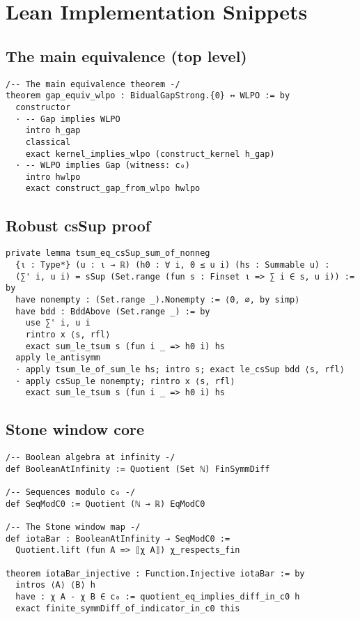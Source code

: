 \documentclass[11pt]{article}  %
\begin{document}

\appendix

\section{Lean Implementation Snippets}

\subsection{The main equivalence (top level)}

\begin{lstlisting}[caption={Complete bidirectional proof (top level)}]
/-- The main equivalence theorem -/
theorem gap_equiv_wlpo : BidualGapStrong.{0} ↔ WLPO := by
  constructor
  · -- Gap implies WLPO
    intro h_gap
    classical
    exact kernel_implies_wlpo (construct_kernel h_gap)
  · -- WLPO implies Gap (witness: c₀)
    intro hwlpo
    exact construct_gap_from_wlpo hwlpo
\end{lstlisting}

\subsection{Robust csSup proof}\label{app:csSup-proof}

\begin{lstlisting}[caption={csSup of partial sums equals the tsum (nonnegative case)}]
private lemma tsum_eq_csSup_sum_of_nonneg
  {ι : Type*} (u : ι → ℝ) (h0 : ∀ i, 0 ≤ u i) (hs : Summable u) :
  (∑' i, u i) = sSup (Set.range (fun s : Finset ι => ∑ i ∈ s, u i)) := by
  have nonempty : (Set.range _).Nonempty := ⟨0, ∅, by simp⟩
  have bdd : BddAbove (Set.range _) := by
    use ∑' i, u i
    rintro x ⟨s, rfl⟩
    exact sum_le_tsum s (fun i _ => h0 i) hs
  apply le_antisymm
  · apply tsum_le_of_sum_le hs; intro s; exact le_csSup bdd ⟨s, rfl⟩
  · apply csSup_le nonempty; rintro x ⟨s, rfl⟩
    exact sum_le_tsum s (fun i _ => h0 i) hs
\end{lstlisting}

\subsection{Stone window core}\label{app:stone-window}

\begin{lstlisting}[caption={Core sketches for Stone window}]
/-- Boolean algebra at infinity -/
def BooleanAtInfinity := Quotient (Set ℕ) FinSymmDiff

/-- Sequences modulo c₀ -/
def SeqModC0 := Quotient (ℕ → ℝ) EqModC0

/-- The Stone window map -/
def iotaBar : BooleanAtInfinity → SeqModC0 :=
  Quotient.lift (fun A => ⟦χ A⟧) χ_respects_fin

theorem iotaBar_injective : Function.Injective iotaBar := by
  intros ⟨A⟩ ⟨B⟩ h
  have : χ A - χ B ∈ c₀ := quotient_eq_implies_diff_in_c0 h
  exact finite_symmDiff_of_indicator_in_c0 this
\end{lstlisting}
\end{document}
